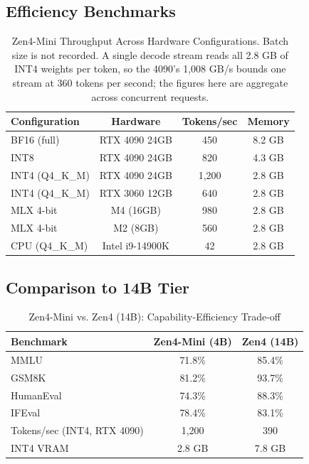 \documentclass[11pt,a4paper]{article}
\begin{document}
\subsection{Efficiency Benchmarks}

\begin{table}[H]
\centering
\begin{tabular}{lccc}
\toprule
\textbf{Configuration} & \textbf{Hardware} & \textbf{Tokens/sec} & \textbf{Memory} \\
\midrule
BF16 (full)     & RTX 4090 24GB    & 450  & 8.2 GB \\
INT8            & RTX 4090 24GB    & 820  & 4.3 GB \\
INT4 (Q4\_K\_M) & RTX 4090 24GB    & 1,200 & 2.8 GB \\
INT4 (Q4\_K\_M) & RTX 3060 12GB    & 640  & 2.8 GB \\
MLX 4-bit       & M4 (16GB)        & 980  & 2.8 GB \\
MLX 4-bit       & M2 (8GB)         & 560  & 2.8 GB \\
CPU (Q4\_K\_M)  & Intel i9-14900K  & 42   & 2.8 GB \\
\bottomrule
\end{tabular}
\caption{Zen4-Mini Throughput Across Hardware Configurations. Batch size is not
recorded. A single decode stream reads all 2.8 GB of INT4 weights per token, so the
4090's 1{,}008 GB/s bounds one stream at 360 tokens per second; the figures here are
aggregate across concurrent requests.}
\end{table}

\subsection{Comparison to 14B Tier}

\begin{table}[H]
\centering
\begin{tabular}{lcc}
\toprule
\textbf{Benchmark} & \textbf{Zen4-Mini (4B)} & \textbf{Zen4 (14B)} \\
\midrule
MMLU         & 71.8\% & 85.4\% \\
GSM8K        & 81.2\% & 93.7\% \\
HumanEval    & 74.3\% & 88.3\% \\
IFEval       & 78.4\% & 83.1\% \\
Tokens/sec (INT4, RTX 4090) & 1,200 & 390 \\
INT4 VRAM    & 2.8 GB & 7.8 GB \\
\bottomrule
\end{tabular}
\caption{Zen4-Mini vs. Zen4 (14B): Capability-Efficiency Trade-off}
\end{table}
\end{document}
